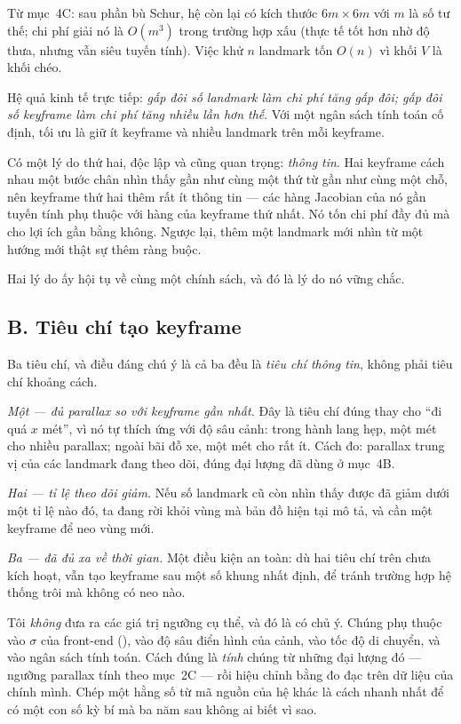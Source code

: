 \documentclass[../../vslam.tex]{subfiles}
\begin{document}
Từ  mục~4C: sau phần bù Schur, hệ còn lại có kích thước \(6m \times 6m\) với \(m\) là số tư thế; chi phí giải nó là \(O(m^3)\) trong trường hợp xấu (thực tế tốt hơn nhờ độ thưa, nhưng vẫn siêu tuyến tính). Việc khử \(n\) landmark tốn \(O(n)\) vì khối \(V\) là khối chéo.

Hệ quả kinh tế trực tiếp: \emph{gấp đôi số landmark làm chi phí tăng gấp đôi; gấp đôi số keyframe làm chi phí tăng nhiều lần hơn thế}. Với một ngân sách tính toán cố định, tối ưu là giữ ít keyframe và nhiều landmark trên mỗi keyframe.

Có một lý do thứ hai, độc lập và cũng quan trọng: \emph{thông tin}. Hai keyframe cách nhau một bước chân nhìn thấy gần như cùng một thứ từ gần như cùng một chỗ, nên keyframe thứ hai thêm rất ít thông tin --- các hàng Jacobian của nó gần tuyến tính phụ thuộc với hàng của keyframe thứ nhất. Nó tốn chi phí đầy đủ mà cho lợi ích gần bằng không. Ngược lại, thêm một landmark mới nhìn từ một hướng mới thật sự thêm ràng buộc.

Hai lý do ấy hội tụ về cùng một chính sách, và đó là lý do nó vững chắc.

\subsection{B. Tiêu chí tạo keyframe}

Ba tiêu chí, và điều đáng chú ý là cả ba đều là \emph{tiêu chí thông tin}, không phải tiêu chí khoảng cách.

\emph{Một --- đủ parallax so với keyframe gần nhất.} Đây là tiêu chí đúng thay cho ``đi quá \(x\) mét'', vì nó tự thích ứng với độ sâu cảnh: trong hành lang hẹp, một mét cho nhiều parallax; ngoài bãi đỗ xe, một mét cho rất ít. Cách đo: parallax trung vị của các landmark đang theo dõi, đúng đại lượng đã dùng ở  mục~4B.

\emph{Hai --- tỉ lệ theo dõi giảm.} Nếu số landmark cũ còn nhìn thấy được đã giảm dưới một tỉ lệ nào đó, ta đang rời khỏi vùng mà bản đồ hiện tại mô tả, và cần một keyframe để neo vùng mới.

\emph{Ba --- đã đủ xa về thời gian.} Một điều kiện an toàn: dù hai tiêu chí trên chưa kích hoạt, vẫn tạo keyframe sau một số khung nhất định, để tránh trường hợp hệ thống trôi mà không có neo nào.

Tôi \emph{không} đưa ra các giá trị ngưỡng cụ thể, và đó là có chủ ý. Chúng phụ thuộc vào \(\sigma\) của front-end (), vào độ sâu điển hình của cảnh, vào tốc độ di chuyển, và vào ngân sách tính toán. Cách đúng là \emph{tính} chúng từ những đại lượng đó --- ngưỡng parallax tính theo  mục~2C --- rồi hiệu chỉnh bằng đo đạc trên dữ liệu của chính mình. Chép một hằng số từ mã nguồn của hệ khác là cách nhanh nhất để có một con số kỳ bí mà ba năm sau không ai biết vì sao.
\end{document}
